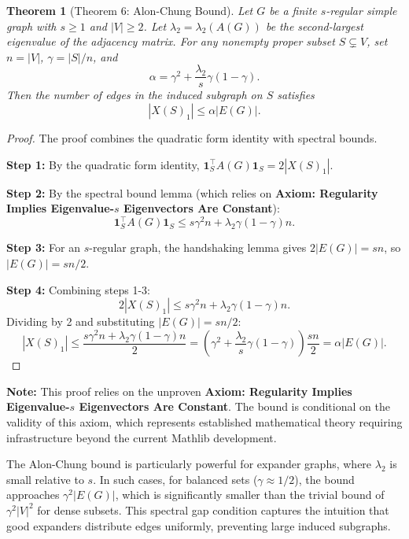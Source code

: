 \documentclass[11pt]{article}
\theoremstyle{plain}
\newtheorem*{theorem}{Theorem}
\theoremstyle{definition}
\theoremstyle{remark}
\begin{document}
\begin{theorem}[Theorem 6: Alon-Chung Bound]
Let $G$ be a finite $s$-regular simple graph with $s \geq 1$ and $|V| \geq 2$. Let $\lambda_2 = \lambda_2(A(G))$ be the second-largest eigenvalue of the adjacency matrix. For any nonempty proper subset $S \subsetneq V$, set $n = |V|$, $\gamma = |S|/n$, and
\[
\alpha = \gamma^2 + \frac{\lambda_2}{s} \gamma(1-\gamma).
\]
Then the number of edges in the induced subgraph on $S$ satisfies
\[
|X(S)_1| \leq \alpha |E(G)|.
\]
\end{theorem}

\begin{proof}
The proof combines the quadratic form identity with spectral bounds.

\textbf{Step 1:} By the quadratic form identity, $\mathbf{1}_S^{\top} A(G) \mathbf{1}_S = 2|X(S)_1|$.

\textbf{Step 2:} By the spectral bound lemma (which relies on \textbf{Axiom: Regularity Implies Eigenvalue-$s$ Eigenvectors Are Constant}):
\[
\mathbf{1}_S^{\top} A(G) \mathbf{1}_S \leq s\gamma^2 n + \lambda_2 \gamma(1-\gamma)n.
\]

\textbf{Step 3:} For an $s$-regular graph, the handshaking lemma gives $2|E(G)| = sn$, so $|E(G)| = sn/2$.

\textbf{Step 4:} Combining steps 1-3:
\[
2|X(S)_1| \leq s\gamma^2 n + \lambda_2 \gamma(1-\gamma)n.
\]
Dividing by 2 and substituting $|E(G)| = sn/2$:
\[
|X(S)_1| \leq \frac{s\gamma^2 n + \lambda_2 \gamma(1-\gamma)n}{2} = \left(\gamma^2 + \frac{\lambda_2}{s}\gamma(1-\gamma)\right) \frac{sn}{2} = \alpha |E(G)|.
\]
\end{proof}

\textbf{Note:} This proof relies on the unproven \textbf{Axiom: Regularity Implies Eigenvalue-$s$ Eigenvectors Are Constant}. The bound is conditional on the validity of this axiom, which represents established mathematical theory requiring infrastructure beyond the current Mathlib development.

The Alon-Chung bound is particularly powerful for expander graphs, where $\lambda_2$ is small relative to $s$. In such cases, for balanced sets ($\gamma \approx 1/2$), the bound approaches $\gamma^2 |E(G)|$, which is significantly smaller than the trivial bound of $\gamma^2 |V|^2$ for dense subsets. This spectral gap condition captures the intuition that good expanders distribute edges uniformly, preventing large induced subgraphs.

\vspace{1em}
\end{document}
